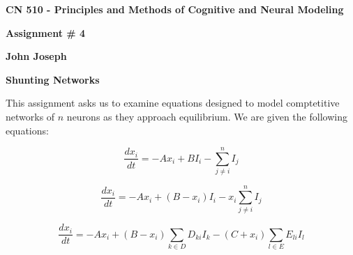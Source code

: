 \documentclass[a4paper,12pt]{article}
\begin{document}
\begin{center}
{\Large\bf CN 510 - Principles and Methods of Cognitive and Neural Modeling}

\bigskip

{\large\bf Assignment \# 4}
\smallskip

{\large\bf John Joseph}
\end{center}

\bigskip
{\bf Shunting Networks}
\bigskip

This assignment asks us to examine equations designed to model comptetitive networks of $n$ neurons as they approach equilibrium. We are given the following equations:

\begin{equation}
  \frac{dx_i}{dt} = -Ax_i+BI_i - \sum\limits_{j \neq i}^n I_j
\end{equation}

\begin{equation}
  \frac{dx_i}{dt} = -Ax_i+(B-x_i)I_i - x_i\sum\limits_{j \neq i}^n I_j
\end{equation}

\begin{equation}
  \frac{dx_i}{dt} = -Ax_i+(B-x_i)\sum\limits_{k \in D}D_{ki}I_k - (C+x_i)\sum\limits_{l\in E}E_{li}I_l
\end{equation}
\end{document}
